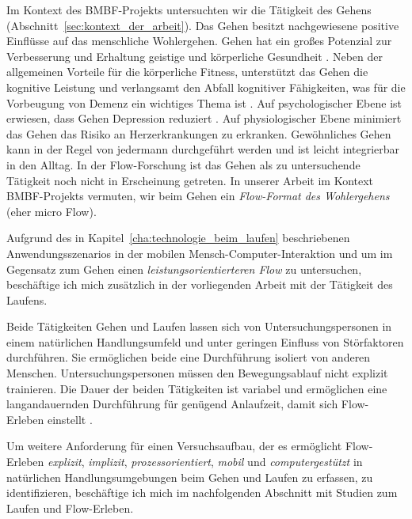 

Im Kontext des BMBF-Projekts untersuchten wir die Tätigkeit des Gehens (Abschnitt~\ref{sec:kontext_der_arbeit}). Das Gehen besitzt nachgewiesene positive Einflüsse auf das menschliche Wohlergehen. Gehen hat ein großes Potenzial zur Verbesserung und Erhaltung geistige und körperliche Gesundheit \citep{Lee2008, Morris1997}. Neben der allgemeinen Vorteile für die körperliche Fitness, unterstützt das Gehen die kognitive Leistung und verlangsamt den Abfall kognitiver Fähigkeiten, was für die Vorbeugung von Demenz ein wichtiges Thema ist \citep{Weuve2004}. Auf psychologischer Ebene ist erwiesen, dass Gehen Depression reduziert \citep{Robertson2012}. Auf physiologischer Ebene minimiert das Gehen das Risiko an Herzerkrankungen zu erkranken. Gewöhnliches Gehen kann in der Regel von jedermann durchgeführt werden und ist leicht integrierbar in den Alltag. In der Flow-Forschung ist das Gehen als zu untersuchende Tätigkeit noch nicht in Erscheinung getreten. In unserer Arbeit im Kontext BMBF-Projekts vermuten, wir beim Gehen ein \emph{Flow-Format des Wohlergehens} (eher micro Flow). 

Aufgrund des in Kapitel~\ref{cha:technologie_beim_laufen} beschriebenen Anwendungsszenarios in der mobilen Mensch-Computer-Interaktion und um im Gegensatz zum Gehen einen \emph{leistungsorientierteren Flow} zu untersuchen, beschäftige ich mich zusätzlich in der vorliegenden Arbeit mit der Tätigkeit des Laufens. 

Beide Tätigkeiten Gehen und Laufen lassen sich von Untersuchungspersonen in einem natürlichen Handlungsumfeld und unter geringen Einfluss von Störfaktoren durchführen. Sie ermöglichen beide eine Durchführung isoliert von anderen Menschen. Untersuchungspersonen müssen den Bewegungsablauf nicht explizit trainieren. Die Dauer der beiden Tätigkeiten ist variabel und ermöglichen eine langandauernden Durchführung für genügend Anlaufzeit, damit sich Flow-Erleben einstellt \citep[S.~109]{Henk2014}.

Um weitere Anforderung für einen Versuchsaufbau, der es ermöglicht Flow-Erleben \emph{explizit}, \emph{implizit}, \emph{prozessorientiert}, \emph{mobil} und \emph{computergestützt} in natürlichen Handlungsumgebungen beim Gehen und Laufen zu erfassen, zu identifizieren, beschäftige ich mich im nachfolgenden Abschnitt mit Studien zum Laufen und Flow-Erleben. 
